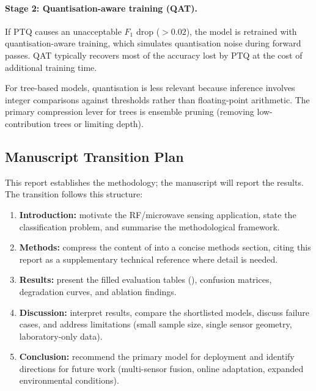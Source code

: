 \paragraph{Stage 2: Quantisation-aware training (QAT).}
If PTQ causes an unacceptable $F_1$ drop ($> 0.02$), the model is
retrained with quantisation-aware training, which simulates
quantisation noise during forward passes.  QAT typically recovers
most of the accuracy lost by PTQ at the cost of additional training
time.

For tree-based models, quantisation is less relevant because
inference involves integer comparisons against thresholds rather
than floating-point arithmetic.  The primary compression lever for
trees is ensemble pruning (removing low-contribution trees or
limiting depth).


\subsection{Manuscript Transition Plan}
\label{subsec:manuscript_plan}

This report establishes the methodology; the manuscript will report
the results.  The transition follows this structure:

\begin{enumerate}
  \item \textbf{Introduction:} motivate the RF/microwave sensing
        application, state the classification problem, and summarise
        the methodological framework.
  \item \textbf{Methods:} compress the content of
         into a concise methods
        section, citing this report as a supplementary technical
        reference where detail is needed.
  \item \textbf{Results:} present the filled evaluation tables
        (), confusion matrices, degradation
        curves, and ablation findings.
  \item \textbf{Discussion:} interpret results, compare the
        shortlisted models, discuss failure cases, and address
        limitations (small sample size, single sensor geometry,
        laboratory-only data).
  \item \textbf{Conclusion:} recommend the primary model for
        deployment and identify directions for future work
        (multi-sensor fusion, online adaptation, expanded
        environmental conditions).
\end{enumerate}


